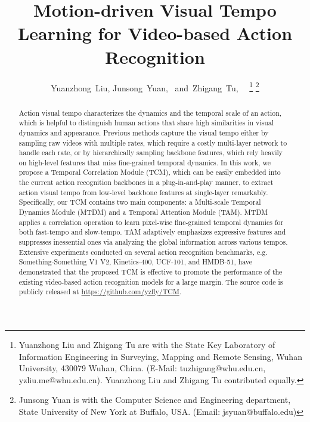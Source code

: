 \documentclass[journal]{IEEEtran}
\begin{document}
\title{Motion-driven Visual Tempo Learning for Video-based Action Recognition}

\author{Yuanzhong~Liu,
Junsong~Yuan,~
and~Zhigang~Tu,~
\
\thanks{Yuanzhong Liu and Zhigang Tu are with the State Key Laboratory of Information Engineering in Surveying, Mapping and Remote Sensing, Wuhan University, 430079 Wuhan, China. (E-Mail: tuzhigang@whu.edu.cn, yzliu.me@whu.edu.cn). Yuanzhong Liu and Zhigang Tu contributed equally.}
\thanks{Junsong Yuan is with the Computer Science and Engineering department, State University of New York at Buffalo, USA. (Email: jsyuan@buffalo.edu)}
}


\maketitle

\begin{abstract}
Action visual tempo characterizes the dynamics and the temporal scale of an action, which is helpful to distinguish human actions that share high similarities in visual dynamics and appearance. Previous methods capture the visual tempo either by sampling raw videos with multiple rates, which require a costly multi-layer network to handle each rate, or by hierarchically sampling backbone features, which rely heavily on high-level features that miss fine-grained temporal dynamics. In this work, we propose a Temporal Correlation Module (TCM), which can be easily embedded into the current action recognition backbones in a plug-in-and-play manner, to extract action visual tempo from low-level backbone features at single-layer remarkably. Specifically, our TCM contains two main components: a Multi-scale Temporal Dynamics Module (MTDM) and a Temporal Attention Module (TAM). MTDM applies a correlation operation to learn pixel-wise fine-grained temporal dynamics for both fast-tempo and slow-tempo. TAM adaptively emphasizes expressive features and suppresses inessential ones via analyzing the global information across various tempos. Extensive experiments conducted on several action recognition benchmarks, e.g. Something-Something V1  V2, Kinetics-400, UCF-101, and HMDB-51, have demonstrated that the proposed TCM is effective to promote the performance of the existing video-based action recognition models for a large margin. The source code is publicly released at \url{https://github.com/yzfly/TCM}.
\end{abstract}
\end{document}
